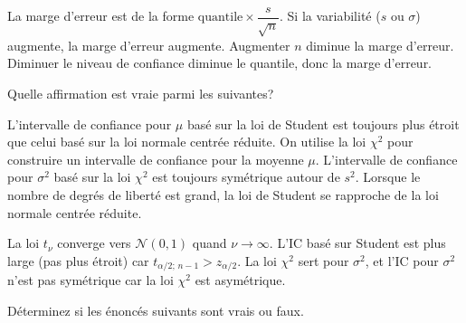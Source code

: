 \begin{questions}
\begin{solution}
La marge d'erreur est de la forme $\text{quantile}\times \dfrac{s}{\sqrt{n}}$. Si la variabilité ($s$ ou $\sigma$) augmente, la marge d'erreur augmente. Augmenter $n$ diminue la marge d'erreur. Diminuer le niveau de confiance diminue le quantile, donc la marge d'erreur.
\end{solution}

\vspace{0.5cm}
\question[4] Quelle affirmation est vraie parmi les suivantes?

\begin{checkboxes}
    \choice L'intervalle de confiance pour $\mu$ basé sur la loi de Student est toujours plus étroit que celui basé sur la loi normale centrée réduite.
    \choice On utilise la loi $\chi^2$ pour construire un intervalle de confiance pour la moyenne $\mu$.
    \choice L'intervalle de confiance pour $\sigma^2$ basé sur la loi $\chi^2$ est toujours symétrique autour de $s^2$.
    \correctchoice Lorsque le nombre de degrés de liberté est grand, la loi de Student se rapproche de la loi normale centrée réduite.
\end{checkboxes}

\begin{solution}
La loi $t_\nu$ converge vers $\mathcal{N}(0,1)$ quand $\nu\to\infty$. L'IC basé sur Student est plus large (pas plus étroit) car $t_{\alpha/2;\,n-1}>z_{\alpha/2}$. La loi $\chi^2$ sert pour $\sigma^2$, et l'IC pour $\sigma^2$ n'est pas symétrique car la loi $\chi^2$ est asymétrique.
\end{solution}

\pageblanche
\question Déterminez si les énoncés suivants sont vrais ou faux.

\end{questions}
